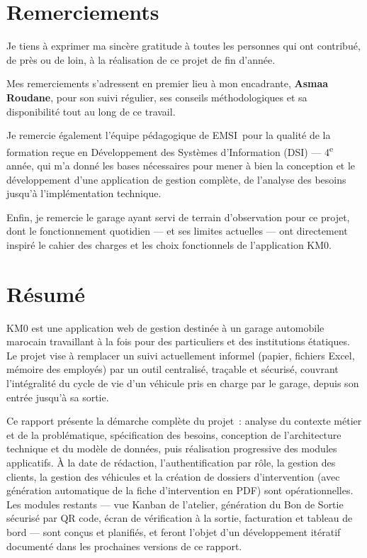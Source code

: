 \documentclass[11pt,a4paper]{report}
\newcommand{\ecoleSigle}{EMSI}
\newcommand{\filiereEtud}{Développement des Systèmes d'Information (DSI) --- 4\textsuperscript{e} année}
\newcommand{\nomEncadrant}{Asmaa Roudane}
\begin{document}
\chapter*{Remerciements}

Je tiens à exprimer ma sincère gratitude à toutes les personnes qui ont contribué,
de près ou de loin, à la réalisation de ce projet de fin d'année.

Mes remerciements s'adressent en premier lieu à mon encadrante, \textbf{\nomEncadrant},
pour son suivi régulier, ses conseils méthodologiques et sa disponibilité tout au long
de ce travail.

Je remercie également l'équipe pédagogique de \ecoleSigle\ pour la qualité de la formation
reçue en \filiereEtud, qui m'a donné les bases nécessaires pour mener à bien la conception
et le développement d'une application de gestion complète, de l'analyse des besoins jusqu'à
l'implémentation technique.

Enfin, je remercie le garage ayant servi de terrain d'observation pour ce projet, dont le
fonctionnement quotidien --- et ses limites actuelles --- ont directement inspiré le
cahier des charges et les choix fonctionnels de l'application KM0.

\clearpage

\chapter*{Résumé}

KM0 est une application web de gestion destinée à un garage automobile marocain travaillant
à la fois pour des particuliers et des institutions étatiques. Le projet vise à remplacer un
suivi actuellement informel (papier, fichiers Excel, mémoire des employés) par un outil
centralisé, traçable et sécurisé, couvrant l'intégralité du cycle de vie d'un véhicule pris
en charge par le garage, depuis son entrée jusqu'à sa sortie.

Ce rapport présente la démarche complète du projet~: analyse du contexte métier et de la
problématique, spécification des besoins, conception de l'architecture technique et du
modèle de données, puis réalisation progressive des modules applicatifs. À la date de
rédaction, l'authentification par rôle, la gestion des clients, la gestion des véhicules
et la création de dossiers d'intervention (avec génération automatique de la fiche
d'intervention en PDF) sont opérationnelles. Les modules restants --- vue Kanban de
l'atelier, génération du Bon de Sortie sécurisé par QR code, écran de vérification à la
sortie, facturation et tableau de bord --- sont conçus et planifiés, et feront l'objet
d'un développement itératif documenté dans les prochaines versions de ce rapport.
\end{document}
